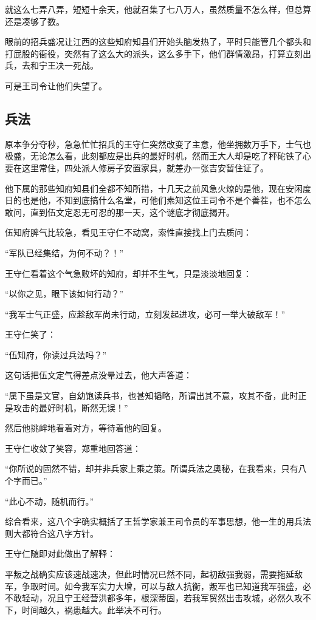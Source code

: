\begin{multicols}{\theparacolNo}
		就这么七弄八弄，短短十余天，他就召集了七八万人，虽然质量不怎么样，但总算还是凑够了数。

		眼前的招兵盛况让江西的这些知府知县们开始头脑发热了，平时只能管几个都头和打屁股的衙役，突然有了这么大的派头，这么多手下，他们群情激昂，打算立刻出兵，去和宁王决一死战。

		可是王司令让他们失望了。

		\subsection{兵法}
		原本争分夺秒，急急忙忙招兵的王守仁突然改变了主意，他坐拥数万手下，士气也极盛，无论怎么看，此刻都应是出兵的最好时机，然而王大人却是吃了秤砣铁了心要在这里常住，四处派人修房子安置家具，就差办一张吉安暂住证了。

		他下属的那些知府知县们全都不知所措，十几天之前风急火燎的是他，现在安闲度日的也是他，不知到底搞什么名堂，可他们素知这位王司令不是个善茬，也不怎么敢问，直到伍文定忍无可忍的那一天，这个谜底才彻底揭开。

		伍知府脾气比较急，看见王守仁不动窝，索性直接找上门去质问：

		“军队已经集结，为何不动？！”

		王守仁看着这个气急败坏的知府，却并不生气，只是淡淡地回复：

		“以你之见，眼下该如何行动？”

		“我军士气正盛，应趁敌军尚未行动，立刻发起进攻，必可一举大破敌军！”

		王守仁笑了：

		“伍知府，你读过兵法吗？”

		这句话把伍文定气得差点没晕过去，他大声答道：

		“属下虽是文官，自幼饱读兵书，也甚知韬略，所谓出其不意，攻其不备，此时正是攻击的最好时机，断然无误！”

		然后他挑衅地看着对方，等待着他的回复。

		王守仁收敛了笑容，郑重地回答道：

		“你所说的固然不错，却并非兵家上乘之策。所谓兵法之奥秘，在我看来，只有八个字而已。”

		“此心不动，随机而行。”

		综合看来，这八个字确实概括了王哲学家兼王司令员的军事思想，他一生的用兵法则大都符合这八字方针。

		王守仁随即对此做出了解释：

		平叛之战确实应该速战速决，但此时情况已然不同，起初敌强我弱，需要拖延敌军，争取时间。如今我军实力大增，可以与敌人抗衡，叛军也已知道我军强盛，必不敢轻动，况且宁王经营洪都多年，根深蒂固，若我军贸然出击攻城，必然久攻不下，时间越久，祸患越大。此举决不可行。


\end{multicols}
